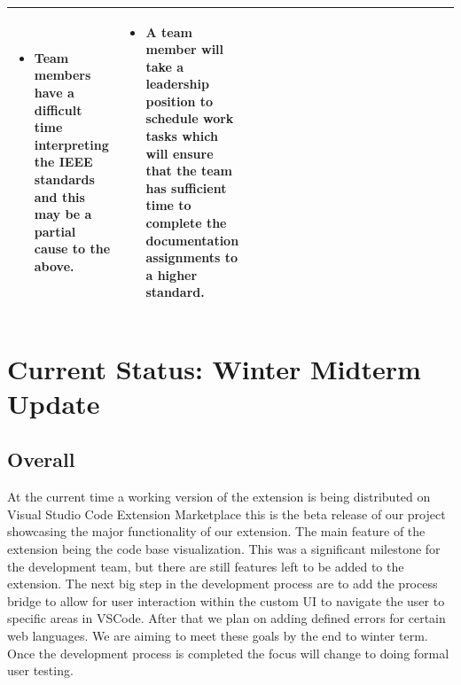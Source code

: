 \documentclass[letterpaper,10pt,titlepage,draftclsnofoot,onecolumn,onesided] {IEEEtran}
\begin{document}
\begin{center}
\begin{singlespace}
\begin{tabular}{ |  p{0.25\linewidth}  |  p{0.25\linewidth}  | p{0.25\linewidth} | p{0.25\linewidth} |}
\begin{itemize}
				\item Team members have a difficult time interpreting the IEEE standards and this may be a partial cause to the above.
			\end{itemize}
		&
			\begin{itemize}
				\item A team member will take a leadership position to schedule work tasks which will ensure that the team has sufficient time to complete the documentation assignments to a higher standard. 
			\end{itemize} 
		\\ \hline
		\end{tabular}
		\end{singlespace}
	\end{center}

\section{Current Status: Winter Midterm Update}
	
	\subsection{Overall}
	At the current time a working version of  the extension is being distributed on Visual Studio Code Extension Marketplace this is the beta release of our project showcasing the major functionality of our extension. 
	The main feature of the extension being the code base visualization. 
	This was a significant milestone for the development team, but there are still features left to be added to the extension. 
	The next big step in the development process are to add the process bridge to allow for user interaction within the custom UI to navigate the user to specific areas in VSCode.
	After that we plan on adding defined errors for certain web languages.
	We are aiming to meet these goals by the end to winter term. 
	Once the development process is completed the focus will change to doing formal user testing. 
	
\end{document}
